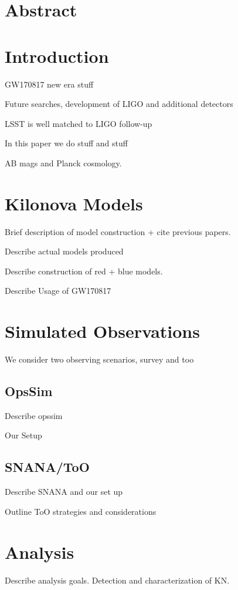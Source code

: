 \clearpage
\section*{Abstract}

\section{Introduction}
\label{sec:ch6_intro}
GW170817 new era stuff

Future searches, development of LIGO and additional detectors 

LSST is well matched to LIGO follow-up

In this paper we do stuff and stuff

AB mags and Planck cosmology.

\section{Kilonova Models}
\label{sec:ch6_models}
Brief description of model construction + cite previous papers.

Describe actual models produced

Describe construction of red + blue models.

Describe Usage of GW170817

\section{Simulated Observations}
\label{sec:ch6_obs}

We consider two observing scenarios, survey and too

\subsection{OpsSim}
\label{sec:ch6_opssim}
Describe opssim

Our Setup

\subsection{SNANA/ToO}
\label{sec:ch6_snana}
Describe SNANA and our set up

Outline ToO strategies and considerations

\section{Analysis}
\label{sec:ch6_analysis}
Describe analysis goals. Detection and characterization of KN. 

